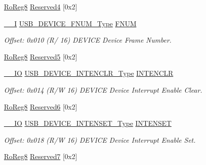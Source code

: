 \begin{DoxyCompactItemize}
\mbox{\hyperlink{group___s_a_m_d21_e15_a__definitions_ga0d957f1433aaf5d70e4dc2b68288442d}{Ro\+Reg8}} \mbox{\hyperlink{struct_usb_device_aec3221203f6f367a8473128fc2f5429e}{Reserved4}} \mbox{[}0x2\mbox{]}
\item 
\mbox{\hyperlink{core__cm0plus_8h_af63697ed9952cc71e1225efe205f6cd3}{\+\_\+\+\_\+I}} \mbox{\hyperlink{union_u_s_b___d_e_v_i_c_e___f_n_u_m___type}{U\+S\+B\+\_\+\+D\+E\+V\+I\+C\+E\+\_\+\+F\+N\+U\+M\+\_\+\+Type}} \mbox{\hyperlink{struct_usb_device_a08a6bd7c8e060195bdeeec9d2355384a}{F\+N\+UM}}
\begin{DoxyCompactList}\small\item\em Offset\+: 0x010 (R/ 16) D\+E\+V\+I\+CE Device Frame Number. \end{DoxyCompactList}\item 
\mbox{\hyperlink{group___s_a_m_d21_e15_a__definitions_ga0d957f1433aaf5d70e4dc2b68288442d}{Ro\+Reg8}} \mbox{\hyperlink{struct_usb_device_a5771b852409b146285e223c4265972b8}{Reserved5}} \mbox{[}0x2\mbox{]}
\item 
\mbox{\hyperlink{core__cm0plus_8h_aec43007d9998a0a0e01faede4133d6be}{\+\_\+\+\_\+\+IO}} \mbox{\hyperlink{union_u_s_b___d_e_v_i_c_e___i_n_t_e_n_c_l_r___type}{U\+S\+B\+\_\+\+D\+E\+V\+I\+C\+E\+\_\+\+I\+N\+T\+E\+N\+C\+L\+R\+\_\+\+Type}} \mbox{\hyperlink{struct_usb_device_a569c897d10b13f70fb9bfba1f33b3171}{I\+N\+T\+E\+N\+C\+LR}}
\begin{DoxyCompactList}\small\item\em Offset\+: 0x014 (R/W 16) D\+E\+V\+I\+CE Device Interrupt Enable Clear. \end{DoxyCompactList}\item 
\mbox{\hyperlink{group___s_a_m_d21_e15_a__definitions_ga0d957f1433aaf5d70e4dc2b68288442d}{Ro\+Reg8}} \mbox{\hyperlink{struct_usb_device_a8e9dcdbe22cc3e20d4b45b25938767e2}{Reserved6}} \mbox{[}0x2\mbox{]}
\item 
\mbox{\hyperlink{core__cm0plus_8h_aec43007d9998a0a0e01faede4133d6be}{\+\_\+\+\_\+\+IO}} \mbox{\hyperlink{union_u_s_b___d_e_v_i_c_e___i_n_t_e_n_s_e_t___type}{U\+S\+B\+\_\+\+D\+E\+V\+I\+C\+E\+\_\+\+I\+N\+T\+E\+N\+S\+E\+T\+\_\+\+Type}} \mbox{\hyperlink{struct_usb_device_a9f694751d75c05c3156be03cf92e39bd}{I\+N\+T\+E\+N\+S\+ET}}
\begin{DoxyCompactList}\small\item\em Offset\+: 0x018 (R/W 16) D\+E\+V\+I\+CE Device Interrupt Enable Set. \end{DoxyCompactList}\item 
\mbox{\hyperlink{group___s_a_m_d21_e15_a__definitions_ga0d957f1433aaf5d70e4dc2b68288442d}{Ro\+Reg8}} \mbox{\hyperlink{struct_usb_device_a635230c3dfb24d3467a4d50456a3483c}{Reserved7}} \mbox{[}0x2\mbox{]}

\end{DoxyCompactItemize}
